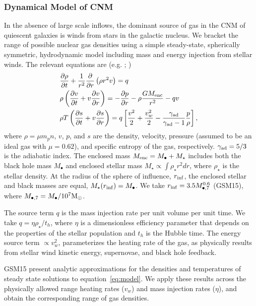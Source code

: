 \documentclass[usenatbib,fleqn]{mnras}
\newcommand{\Mbh}[1][]{M_{\bullet#1}}
\newcommand{\Menc}{M_{\rm enc}}
\newcommand{\Msun}{{\rm M_\odot}}
\begin{document}
\subsubsection{Dynamical Model of CNM}
\label{sec:model}

In the absence of large scale inflows, the dominant source of gas in
the CNM of quiescent galaxies is winds from stars in the galactic
nucleus. We bracket the range of possible nuclear gas densities using
a simple steady-state, spherically symmetric, hydrodynamic model
including mass and energy injection from stellar winds. The relevant
equations are (e.g. \citealt{Holzer+1970}; \citealt{Quataert2004})
\begin{align}
  &\frac{\partial \rho}{\partial t}+\frac{1}{r^2}\frac{\partial}{\partial r}\left(\rho r^2 v\right)=q \label{eq:drhodt}\\
  &\rho \left(\frac{\partial v}{\partial t} + v\frac{\partial
      v}{\partial r}\right) =-\frac{\partial p}{\partial r}- \rho\frac{GM_{\rm enc}}{r^{2}} -q v \label{eq:dvdt}\\
  &\rho T\left(\frac{\partial s}{\partial t} + v\frac{\partial
      s}{\partial
      r}\right)=q\left[\frac{v^2}{2}+\frac{v_w^2}{2}-\frac{\gamma_{\rm
      ad}}{\gamma_{\rm ad}-1}
    \frac{p}{\rho} \right] ,
\label{eq:model}
\end{align}
where $\rho = \mu m_p n$, $v$, $p$, and $s$ are the density, velocity,
pressure (assumed to be an ideal gas with $\mu = 0.62$), and specific
entropy of the gas, respectively.  $\gamma_{\rm ad}=5/3$ is the
adiabatic index. The enclosed mass $\Menc = M_{\bullet} + M_{\star}$
includes both the black hole mass $M_{\bullet}$ and enclosed stellar
mass $M_{\star} \propto \int \rho_{\star}r^{2}dr$, where
$\rho_{\star}$ is the stellar density. At the radius of the sphere of
influence, $r_{\rm inf}$, the enclosed stellar and black masses are
equal, $M_{\star}(r_{\rm inf})=\Mbh$.  We take $r_{\rm inf}=3.5
\Mbh[,7]^{0.6}$ (GSM15), where $\Mbh[,7]=\Mbh/10^7 \Msun$.

The source term $q$ is the mass injection rate per unit volume per
unit time. We take $q=\eta \rho_{\star}/t_h$, where $\eta$ is a
dimensionless efficiency parameter that depends on the properties of
the stellar population and $t_h$ is the Hubble time. The energy source
term $\propto v_w^{2}$, parameterizes the heating rate of the gas, as
physically results from stellar wind kinetic energy, supernovae, and
black hole feedback.

GSM15 present analytic approximations for the
densities and temperatures of steady state solutions to
equation~\eqref{eq:model}. We apply these results across the
physically allowed range heating rates ($v_w$) and mass injection
rates ($\eta$), and obtain the corresponding range of gas densities.
\end{document}
